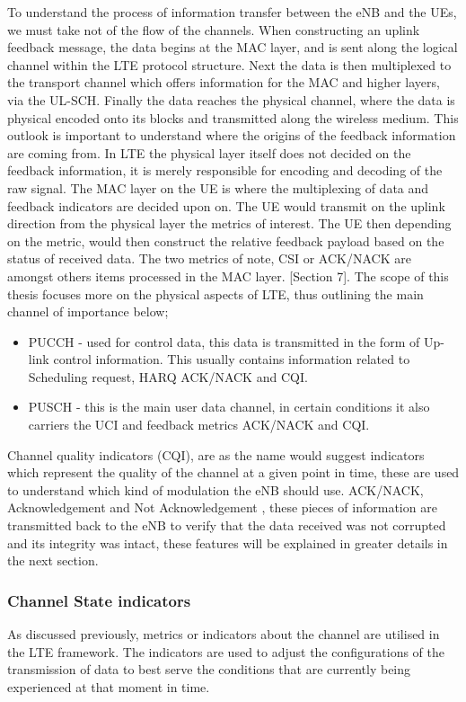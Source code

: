 \documentclass{article}
\begin{document}
To understand the process of information transfer between the eNB and the UEs, we must take not of the flow of the channels. When constructing an uplink feedback message, the data begins at the MAC layer, and is sent along the logical channel within the LTE protocol structure. Next the data is then multiplexed to the transport channel which offers information for the MAC and higher layers, via the UL-SCH. Finally the data reaches the physical channel, where the data is physical encoded onto its blocks and transmitted along the wireless medium. This outlook is important to understand where the origins of the feedback information are coming from. In LTE the physical layer itself does not decided on the feedback information, it is merely responsible for encoding and decoding of the raw signal. The MAC layer on the UE is where the multiplexing of data and feedback indicators are decided upon on. The UE would transmit on the uplink direction from the physical layer the metrics of interest. The UE then depending on the metric, would then construct the relative feedback payload based on the status of received data. The two metrics of note, \ac{CSI} or ACK/NACK are amongst others items processed in the MAC layer. \cite{3gpp25319}[Section 7]. The scope of this thesis focuses more on the physical aspects of LTE, thus outlining the main channel of importance below;
\begin{itemize}
    \item PUCCH - used for control data, this data is transmitted in the form of Up-link control information. This usually contains information related to Scheduling request, HARQ ACK/NACK and CQI. 
    \item PUSCH - this is the main user data channel, in certain conditions it also carriers the UCI and feedback metrics ACK/NACK and CQI.
\end{itemize}
Channel quality indicators (CQI), are as the name would suggest indicators which represent the quality of the channel at a given point in time, these are used to understand which kind of modulation the eNB should use. ACK/NACK, Acknowledgement and Not Acknowledgement , these pieces of information are transmitted back to the eNB to verify that the data received was not corrupted and its integrity was intact, these features will be explained in greater details in the next section.

\subsubsection{Channel State indicators}
As discussed previously, metrics or indicators about the channel are utilised in the LTE framework. The indicators are used to adjust the configurations of the transmission of data to best serve the conditions that are currently being experienced at that moment in time. 
\end{document}
